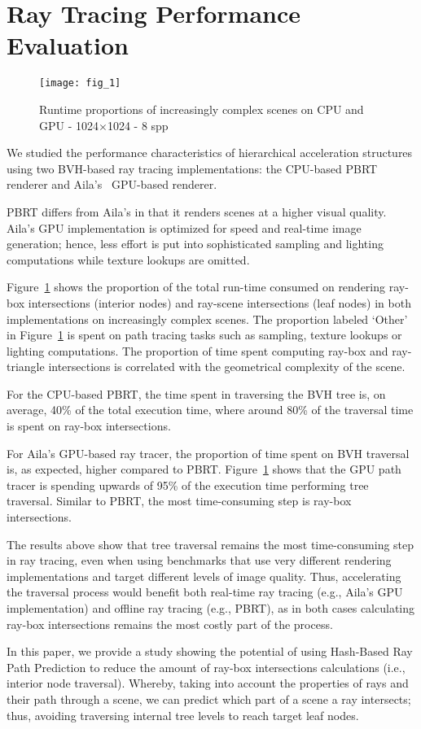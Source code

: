 \section{Ray Tracing Performance Evaluation}

\begin{figure}[h]
  \centering
  \texttt{[image: fig\_1]}
 
  \caption{\label{fig:figure1}
           Runtime proportions of increasingly complex scenes on CPU and GPU - 1024$\times$1024 - 8 spp}
\end{figure}



We studied the performance characteristics of hierarchical acceleration structures using two BVH-based ray tracing implementations: the CPU-based PBRT~\cite{Pharr:2010:PBR:1854996} renderer and Aila's~\cite{Aila:2009:UER:1572769.1572792} GPU-based renderer. 

PBRT differs from Aila's in that it renders scenes at a higher visual quality. Aila's GPU implementation is optimized for speed and real-time image generation; hence, less effort is put into sophisticated sampling and lighting computations while texture lookups are omitted.

Figure~\ref{fig:figure1} shows the proportion of the total run-time consumed on rendering ray-box intersections (interior nodes) and ray-scene intersections (leaf nodes) in both implementations on increasingly complex scenes. The proportion labeled `Other' in Figure~\ref{fig:figure1} is spent on path tracing tasks such as sampling, texture lookups or lighting computations. The proportion of time spent computing ray-box and ray-triangle intersections is correlated with the geometrical complexity of the scene.

For the CPU-based PBRT, the time spent in traversing the BVH tree is, on average, 40\% of the total execution time, where around 80\% of the traversal time is spent on ray-box intersections.

For Aila's GPU-based ray tracer, the proportion of time spent on BVH traversal is, as expected, higher compared to PBRT. Figure~\ref{fig:figure1} shows that the GPU path tracer is spending upwards of 95\% of the execution time performing tree traversal. Similar to PBRT, the most time-consuming step is ray-box intersections.

The results above show that tree traversal remains the most time-consuming step in ray tracing, even when using benchmarks that use very different rendering implementations and target different levels of image quality. Thus, accelerating the traversal process would benefit both real-time ray tracing (e.g., Aila's GPU implementation) and offline ray tracing (e.g., PBRT), as in both cases calculating ray-box intersections remains the most costly part of the process.

In this paper, we provide a study showing the potential of using Hash-Based Ray Path Prediction to reduce the amount of ray-box intersections calculations (i.e., interior node traversal). Whereby, taking into account the properties of rays and their path through a scene, we can predict which part of a scene a ray intersects; thus, avoiding traversing internal tree levels to reach target leaf nodes.
